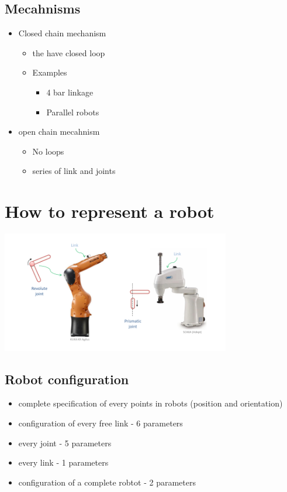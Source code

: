 \documentclass{article}
\begin{document}
\subsection{Mecahnisms}
\begin{itemize}
	\item Closed chain mechanism
	      \begin{itemize}
		      \item the have closed loop
		      \item Examples
		            \begin{itemize}
			            \item 4 bar linkage
			            \item Parallel robots
		            \end{itemize}
	      \end{itemize}
	\item open chain mecahnism
	      \begin{itemize}
		      \item No loops
		      \item series of link and joints
	      \end{itemize}
\end{itemize}
\section{How to represent a robot}
\begin{center}
	\includegraphics[width=10cm]{img/represent-robot.png}
\end{center}
\subsection{Robot configuration }
\begin{itemize}
	\item complete specification of every points in robots (position and orientation)
	\item configuration of every free link - 6 parameters
	\item every joint - 5 parameters
	\item every link - 1 parameters
	\item configuration of a complete robtot - 2 parameters
\end{itemize}
\end{document}
